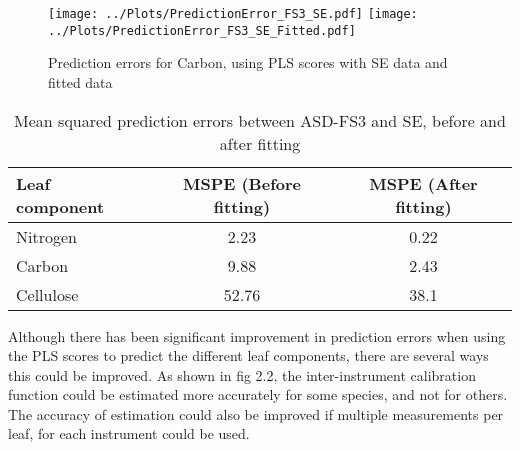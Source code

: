 \begin{figure}[H]
\centering
\texttt{[image: ../Plots/PredictionError\_FS3\_SE.pdf]}
\texttt{[image: ../Plots/PredictionError\_FS3\_SE\_Fitted.pdf]}
\caption{Prediction errors for Carbon, using PLS scores with SE data and fitted data}
\label{fig:Fig3.6}
\end{figure}

\begin{table}[H]
\centering
\begin{tabular}{l|c|c}
\hline
\hline
Leaf component & MSPE (Before fitting) & MSPE (After fitting) \\
\hline
Nitrogen & 2.23 & 0.22 \\
Carbon & 9.88 & 2.43\\
Cellulose & 52.76 & 38.1 \\
\hline
\hline
\end{tabular}
\caption{Mean squared prediction errors between ASD-FS3 and SE, before and after fitting}
\label{tab:tab3.2}
\end{table}

Although there has been significant improvement in prediction errors when using the PLS scores to predict the different leaf components, there are several ways this could be improved. As shown in fig 2.2, the inter-instrument calibration function could be estimated more accurately for some species, and not for others. The accuracy of estimation could also be improved if multiple measurements per leaf, for each instrument could be used. 